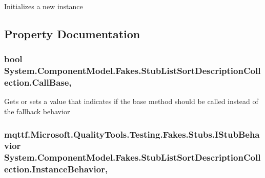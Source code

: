 Initializes a new instance



\subsection{Property Documentation}
\hypertarget{class_system_1_1_component_model_1_1_fakes_1_1_stub_list_sort_description_collection_a6594fb8de4e0f44ec75cc06f67c59fc6}{
\subsubsection[{Call\-Base}]{\setlength{\rightskip}{0pt plus 5cm}bool System.\-Component\-Model.\-Fakes.\-Stub\-List\-Sort\-Description\-Collection.\-Call\-Base\hspace{0.3cm}{\ttfamily [get]}, {\ttfamily [set]}}}\label{class_system_1_1_component_model_1_1_fakes_1_1_stub_list_sort_description_collection_a6594fb8de4e0f44ec75cc06f67c59fc6}


Gets or sets a value that indicates if the base method should be called instead of the fallback behavior

\hypertarget{class_system_1_1_component_model_1_1_fakes_1_1_stub_list_sort_description_collection_abb2b8a99c795482cca3a06f20ca9ad9b}{
\subsubsection[{Instance\-Behavior}]{\setlength{\rightskip}{0pt plus 5cm}mqttf.\-Microsoft.\-Quality\-Tools.\-Testing.\-Fakes.\-Stubs.\-I\-Stub\-Behavior System.\-Component\-Model.\-Fakes.\-Stub\-List\-Sort\-Description\-Collection.\-Instance\-Behavior\hspace{0.3cm}{\ttfamily [get]}, {\ttfamily [set]}}}\label{class_system_1_1_component_model_1_1_fakes_1_1_stub_list_sort_description_collection_abb2b8a99c795482cca3a06f20ca9ad9b}


